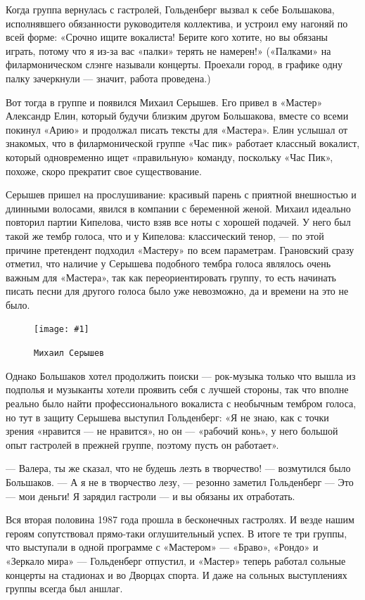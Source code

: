 \documentclass[10pt, twoside]{book}
\newcommand{\myincludegraphics}[1]{\texttt{[image: \#1]}}
\begin{document}
Когда группа вернулась с гастролей, Гольденберг вызвал к себе Большакова, исполнявшего обязанности руководителя
коллектива, и устроил ему нагоняй по всей форме: «Срочно ищите вокалиста! Берите кого хотите, но вы обязаны играть,
потому что я из-за вас «палки» терять не намерен!» («Палками» на филармоническом слэнге называли концерты. Проехали
город, в графике одну палку зачеркнули — значит, работа проведена.)

Вот тогда в группе и появился Михаил Серышев. Его привел в «Мастер» Александр Елин, который будучи близким другом
Большакова, вместе со всеми покинул «Арию» и продолжал писать тексты для «Мастера». Елин услышал от знакомых, что в
филармонической группе «Час пик» работает классный вокалист, который одновременно ищет «правильную» команду, поскольку
«Час Пик», похоже, скоро прекратит свое существование.

Серышев пришел на прослушивание: красивый парень с приятной внешностью и длинными волосами, явился в компании с
беременной женой. Михаил идеально повторил партии Кипелова, чисто взяв все ноты с хорошей подачей. У него был такой же
тембр голоса, что и у Кипелова: классический тенор, — по этой причине претендент подходил «Мастеру» по всем параметрам.
Грановский сразу отметил, что наличие у Серышева подобного тембра голоса являлось очень важным для «Мастера», так как
переориентировать группу, то есть начинать писать песни для другого голоса было уже невозможно, да и времени на это не
было.

\begin{figure}
    \centering
    \myincludegraphics{Image20}
    \caption{\texttt{Михаил Серышев}}
\end{figure}

Однако Большаков хотел продолжить поиски — рок-музыка только что вышла из подполья и музыканты хотели проявить себя с
лучшей стороны, так что вполне реально было найти профессионального вокалиста с необычным тембром голоса, но тут в
защиту Серышева выступил Гольденберг: «Я не знаю, как с точки зрения «нравится — не нравится», но он — «рабочий конь», у
него большой опыт гастролей в прежней группе, поэтому пусть он работает».

— Валера, ты же сказал, что не будешь лезть в творчество! — возмутился было Большаков.
— А я не в творчество лезу, — резонно заметил Гольденберг — Это — мои деньги! Я зарядил гастроли — и вы обязаны их
отработать.

Вся вторая половина 1987 года прошла в бесконечных гастролях. И везде нашим героям сопутствовал прямо-таки оглушительный
успех. В итоге те три группы, что выступали в одной программе с «Мастером» — «Браво», «Рондо» и «Зеркало мира» —
Гольденберг отпустил, и «Мастер» теперь работал сольные концерты на стадионах и во Дворцах спорта. И даже на сольных
выступлениях группы всегда был аншлаг.
\end{document}
